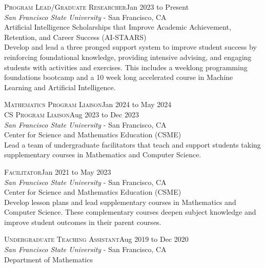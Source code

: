 \documentclass[hidelinks, 10pt]{article}
\begin{document}
{\begin{minipage}[ct]{0.9\linewidth}
    \textsc{Program Lead/Graduate Researcher}\hfill Jan 2023 to Present\\
    {\emph{San Francisco State University} - San Francisco, CA}\\
    Artificial Intelligence Scholarships that Improve Academic Achievement, Retention, and Career Success (AI-STAARS)\\
    Develop and lead a three pronged support system to improve student success by reinforcing foundational knowledge, providing intensive
    advising, and engaging students with activities and exercises. This includes a weeklong programming foundations bootcamp and a 10 week
    long accelerated course in Machine Learning and Artificial Intelligence.
\end{minipage}

\vspace{4mm}

\begin{minipage}[ct]{0.9\linewidth}
    \textsc{Mathematics Program Liaison}\hfill Jan 2024 to May 2024\\
    \textsc{CS Program Liaison}\hfill Aug 2023 to Dec 2023\\
    {\emph{San Francisco State University} - San Francisco, CA}\\
    Center for Science and Mathematics Education (CSME)\\
    Lead a team of undergraduate facilitators that teach and support students taking supplementary courses in Mathematics and Computer
    Science.
\end{minipage}

\vspace{4mm}

\begin{minipage}[ct]{0.9\linewidth}
    \textsc{Facilitator}\hfill Jan 2021 to May 2023\\
    {\emph{San Francisco State University} - San Francisco, CA}\\
    Center for Science and Mathematics Education (CSME)\\
    Develop lesson plans and lead supplementary courses in Mathematics and Computer Science.  These complementary courses deepen subject
    knowledge and improve student outcomes in their parent courses.
\end{minipage}

\vspace{4mm}

\begin{minipage}[ct]{0.9\linewidth}
    \textsc{Undergraduate Teaching Assistant}\hfill Aug 2019 to Dec 2020\\
    {\emph{San Francisco State University} - San Francisco, CA}\\
    Department of Mathematics
\end{minipage}

}
\end{document}
